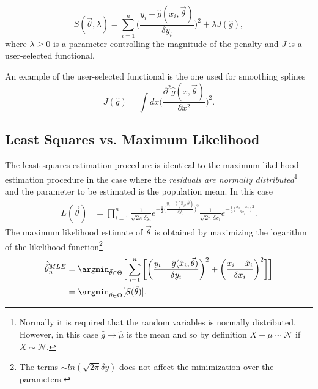 \begin{equation}
	S(\vec{\theta},\lambda)=\sum_{i=1}^n\bigg(\frac{y_i-\hat{g}(x_i,\vec{\theta})}{\delta y_i}\bigg)^2+\lambda J(\hat{g}),
	\label{eq8p}
\end{equation} 
where $\lambda\geq 0$ is a parameter controlling the magnitude of the penalty and $J$ is a user-selected functional.
\begin{example}
	An example of the user-selected functional is the one used for smoothing splines
	\begin{equation}
		J(\hat{g})=\int dx \bigg(\frac{\partial ^2 \hat{g}(x,\vec{ \theta})}{\partial x^2}\bigg)^2.
	\end{equation}
\end{example}


\subsection{Least Squares vs. Maximum Likelihood}
The least squares estimation procedure is identical to the maximum likelihood estimation procedure in the case where the \emph{residuals are normally distributed}\footnote{Normally it is required that the random variables is normally distributed. However, in this case $\hat{g}\rightarrow \hat{\mu}$ is the mean and so by definition $X-\mu\sim \mathcal{N}$ if $X\sim \mathcal{N}$.} and the parameter to be estimated is the population mean. In this case
\begin{equation}
	\begin{split}
		L(\vec{\theta})&=\prod_{i=1}^n\frac{1}{\sqrt{2\pi}\delta y_i}e^{-\frac{1}{2}\big(\frac{y_i-\hat{g}(\hat{x}_i,\vec{\theta})}{\delta y_i}\big)^2}\frac{1}{\sqrt{2\pi}\delta x_i}e^{-\frac{1}{2}\big(\frac{x_i-\hat{x}_i}{\delta x_i}\big)^2}.
	\end{split}
\end{equation}
The maximum likelihood estimate of $\vec{\theta}$ is obtained by maximizing the logarithm of the likelihood function\footnote{The terms $\sim ln(\sqrt{2\pi}\delta y)$ does not affect the minimization over the parameters.} 
\begin{equation}
	\begin{split}
		\hat{\vec{\theta}}^{MLE}_n&=\argmin_{\vec{\theta}\in \Theta}\bigg[\sum_{i=1}^n\bigg[\bigg(\frac{y_i-\hat{g}(\hat{x}_i,\vec{\theta})}{\delta y_i}\bigg)^2+\bigg(\frac{x_i-\hat{x}_i}{\delta x_i}\bigg)^2\bigg]\bigg]\\
		&=  \argmin_{\vec{\theta}\in \Theta}[S(\vec{ \theta})].
	\end{split}
\end{equation}
